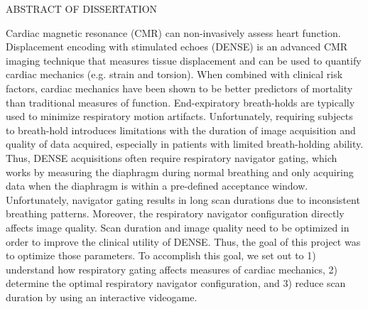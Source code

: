 
\thispagestyle{empty} %

\newcommand*{\SignatureAndDate}[2]{%
	\par\hfill\noindent\makebox[2.5in]{#1}
	\vspace{-0.15in}
	\par\hfill\noindent\makebox[2.5in]{\hrulefill}
	\par\hfill\makebox[2.5in][c]{}
	\vspace{0.05in}
	\par\hfill\noindent\makebox[2.5in]{#2}
	\vspace{-0.15in}
	\par\hfill\noindent\makebox[2.5in]{\hrulefill}
	\vspace{-0.05in}
	\par\hfill\noindent\makebox[2.5in][c]{Date}
}%

\begin{center}
	ABSTRACT OF DISSERTATION\\
	\vspace{0.5in}
	\makeatletter
	\@title
	\makeatother
\end{center}

Cardiac magnetic resonance (CMR) can non-invasively assess heart function. Displacement encoding with stimulated echoes (DENSE) is an advanced CMR imaging technique that measures tissue displacement and can be used to quantify cardiac mechanics (e.g. strain and torsion). When combined with clinical risk factors, cardiac mechanics have been shown to be better predictors of mortality than traditional measures of function.
End-expiratory breath-holds are typically used to minimize respiratory motion artifacts. Unfortunately, requiring subjects to breath-hold introduces limitations with the duration of image acquisition and quality of data acquired, especially in patients with limited breath-holding ability. Thus, DENSE acquisitions often require respiratory navigator gating, which works by measuring the diaphragm during normal breathing and only acquiring data when the diaphragm is within a pre-defined acceptance window.\\

Unfortunately, navigator gating results in long scan durations due to inconsistent breathing patterns. Moreover, the respiratory navigator configuration directly affects image quality. Scan duration and image quality need to be optimized in order to improve the clinical utility of DENSE. Thus, the goal of this project was to optimize those parameters. To accomplish this goal, we set out to 1) understand how respiratory gating affects measures of cardiac mechanics, 2) determine the optimal respiratory navigator configuration, and 3) reduce scan duration by using an interactive videogame.\\

